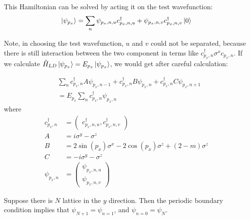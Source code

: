 \documentclass{article}
\begin{document}
This Hamiltonian can be solved by acting it on the test wavefunction:
\begin{equation}
    \ket{\psi_{p_x}} = \sum_n \psi_{p_x,n,u} c^\dagger_{p_x,n,u} +
                        \psi_{p_x,n,v} c^\dagger_{p_x,n,v} \ket{0}
\end{equation}

Note, in choosing the test wavefunction, $u$ and $v$ could not be
separated, because there is still interaction between the two
component in terms like $c^\dagger_{p_x,n}\sigma^x c_{p_x,n}$.
If we calculate $\tilde H_{LD}\ket{\psi_{p_x}} = E_{p_x}
\ket{\psi_{p_x}}$, we would get after careful calculation:

\begin{align}
    & \sum_n
    c^\dagger_{p_x,n} A   \psi_{p_x,n-1}
    + c^\dagger_{p_x,n} B \psi_{p_x,n} 
    + c^\dagger_{p_x,n} C \psi_{p_x,n+1}
    \nonumber\\
    &= E_{p_x} \sum_n c^\dagger_{p_x,n}\psi_{p_x,n}
\end{align}
where
\begin{align}
    c^\dagger_{p_x,n} &= \begin{pmatrix}
        c^\dagger_{p_x,n,u},  c^\dagger_{p_x,n,v}
    \end{pmatrix} \\
    A &= i\sigma^y - \sigma^z \\
    B &= 2\sin(p_x)\sigma^x - 2\cos(p_x)\sigma^z + (2-m)\sigma^z \\
    C &= -i\sigma^y - \sigma^z \\
    \psi_{p_x,n} &= \begin{pmatrix}
        \psi_{p_x,n,u} \\ \psi_{p_x,n,v}
    \end{pmatrix}
\end{align}

Suppose there is $N$ lattice in the $y$ direction. Then the periodic
boundary condition implies that $\psi_{N+1}=\psi_{n=1}$, and
$\psi_{n=0} = \psi_N$.
\end{document}
